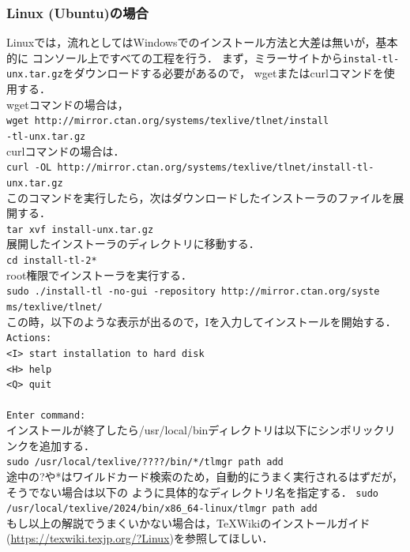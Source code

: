 \subsubsection{Linux (Ubuntu)の場合}
Linuxでは，流れとしてはWindowsでのインストール方法と大差は無いが，基本的に
コンソール上ですべての工程を行う．
まず，ミラーサイトから\texttt{instal-tl-unx.tar.gz}をダウンロードする必要があるので，
wgetまたはcurlコマンドを使用する．\\
wgetコマンドの場合は，\\
\texttt{wget http://mirror.ctan.org/systems/texlive/tlnet/install\\-tl-unx.tar.gz}\\
curlコマンドの場合は．\\
\texttt{curl -OL http://mirror.ctan.org/systems/texlive/tlnet/install-tl-unx.tar.gz}\\
このコマンドを実行したら，次はダウンロードしたインストーラのファイルを展開する．\\
\texttt{tar xvf install-unx.tar.gz}\\
展開したインストーラのディレクトリに移動する．\\
\texttt{cd install-tl-2*}\\
root権限でインストーラを実行する．\\
\texttt{sudo ./install-tl -no-gui -repository
  http://mirror.ctan.org/syste\\ms/texlive/tlnet/}\\
この時，以下のような表示が出るので，Iを入力してインストールを開始する．
\texttt{
  Actions: \\
  <I> start  installation to hard disk\\
  <H> help\\
  <Q> quit\\
  \\
  Enter command:
}\\
インストールが終了したら/usr/local/binディレクトリは以下にシンボリックリンクを追加する．\\
\texttt{sudo /usr/local/texlive/????/bin/*/tlmgr path add}\\
途中の?や*はワイルドカード検索のため，自動的にうまく実行されるはずだが，そうでない場合は以下の
ように具体的なディレクトリ名を指定する．
\texttt{sudo /usr/local/texlive/2024/bin/x86\_64-linux/tlmgr path add}\\
もし以上の解説でうまくいかない場合は，TeXWikiのインストールガイド(\url{https://texwiki.texjp.org/?Linux})を参照してほしい．
\newpage
